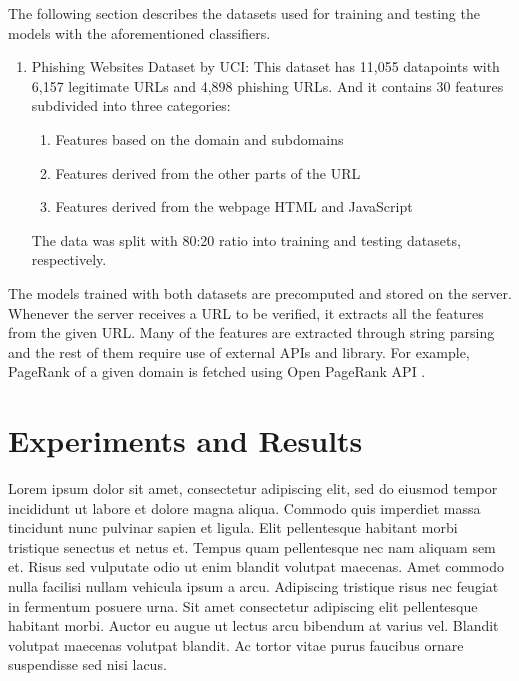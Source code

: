 \documentclass[conference]{IEEEtran}
\begin{document}
\par The following section describes the datasets used for training and testing the models with the aforementioned classifiers.
\begin{enumerate}
    \item Phishing Websites Dataset by UCI\cite{UCIDataset}:
          This dataset has 11,055 datapoints with 6,157 legitimate URLs and 4,898 phishing URLs.
          And it contains 30 features subdivided into three categories:
          \begin{enumerate}
              \item Features based on the domain and subdomains
              \item Features derived from the other parts of the URL
              \item Features derived from the webpage HTML and JavaScript
          \end{enumerate}
          The data was split with 80:20 ratio into training and testing datasets, respectively.
\end{enumerate}

The models trained with both datasets are precomputed and stored on the server.
Whenever the server receives a URL to be verified, it extracts all the features from the given URL.
Many of the features are extracted through string parsing and the rest of them require use of external APIs and library.
For example, PageRank of a given domain is fetched using Open PageRank API \cite{OpenPageRank}.

\section{Experiments and Results}
Lorem ipsum dolor sit amet, consectetur adipiscing elit, sed do eiusmod tempor incididunt ut labore et dolore magna aliqua. Commodo quis imperdiet massa tincidunt nunc pulvinar sapien et ligula. Elit pellentesque habitant morbi tristique senectus et netus et. Tempus quam pellentesque nec nam aliquam sem et. Risus sed vulputate odio ut enim blandit volutpat maecenas. Amet commodo nulla facilisi nullam vehicula ipsum a arcu. Adipiscing tristique risus nec feugiat in fermentum posuere urna. Sit amet consectetur adipiscing elit pellentesque habitant morbi. Auctor eu augue ut lectus arcu bibendum at varius vel. Blandit volutpat maecenas volutpat blandit. Ac tortor vitae purus faucibus ornare suspendisse sed nisi lacus.
\end{document}
